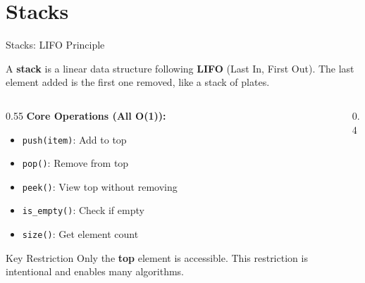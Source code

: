 \documentclass[aspectratio=169,xcolor=dvipsnames]{beamer}
\begin{document}
\section{Stacks}

\begin{frame}{Stacks: LIFO Principle}
  \begin{definition}
    A \textbf{stack} is a linear data structure following \textbf{LIFO} (Last In, First Out). The last element added is the first one removed, like a stack of plates.
  \end{definition}

  \vspace{0.3cm}

  \begin{columns}
    \begin{column}{0.55\textwidth}
      \textbf{Core Operations (All O(1)):}
      \begin{itemize}
        \item \texttt{push(item)}: Add to top
        \item \texttt{pop()}: Remove from top
        \item \texttt{peek()}: View top without removing
        \item \texttt{is\_empty()}: Check if empty
        \item \texttt{size()}: Get element count
      \end{itemize}

      \vspace{0.3cm}

      \begin{alertblock}{Key Restriction}
        Only the \textbf{top} element is accessible. This restriction is intentional and enables many algorithms.
      \end{alertblock}
    \end{column}
    \begin{column}{0.4\textwidth}
    \end{column}
  \end{columns}
\end{frame}
\end{document}

